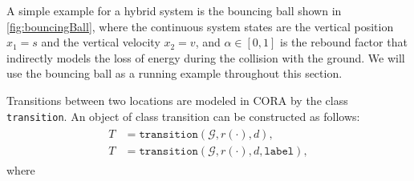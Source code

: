A simple example for a hybrid system is the bouncing ball shown in \cref{fig:bouncingBall}, where the continuous system states are the vertical position $x_1 = s$ and the vertical velocity $x_2 = v$, and $\alpha \in [0,1]$ is the rebound factor that indirectly models the loss of energy during the collision with the ground. We will use the bouncing ball as a running example throughout this section.

\vspace{0.2cm}

Transitions between two locations are modeled in CORA by the class \texttt{transition}. An object of class transition can be constructed as follows:
\begin{align}
    \begin{split}
        \label{eq:transition}
        T &= \texttt{transition}(\mathcal{G},r(\cdot),d), \\
        T &= \texttt{transition}(\mathcal{G},r(\cdot),d,\texttt{label}),
    \end{split}
\end{align}
where
